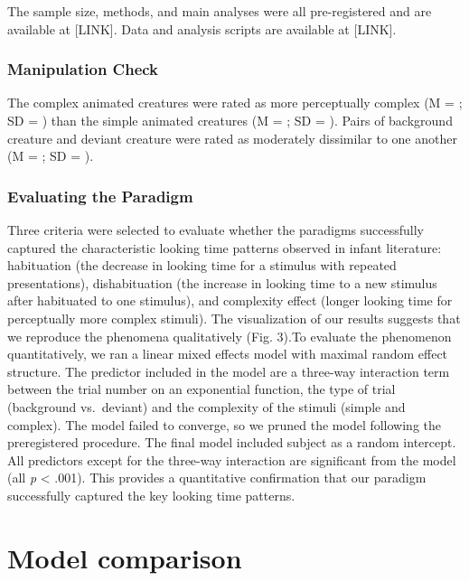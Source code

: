 \documentclass[10pt, letterpaper]{article}
\begin{document}
The sample size, methods, and main analyses were all pre-registered and
are available at {[}LINK{]}. Data and analysis scripts are available at
{[}LINK{]}.

\hypertarget{manipulation-check}{%
\subsubsection{Manipulation Check}\label{manipulation-check}}

The complex animated creatures were rated as more perceptually complex
(M = ; SD = ) than the simple animated creatures (M = ; SD = ). Pairs of
background creature and deviant creature were rated as moderately
dissimilar to one another (M = ; SD = ).

\hypertarget{evaluating-the-paradigm}{%
\subsubsection{Evaluating the Paradigm}\label{evaluating-the-paradigm}}

Three criteria were selected to evaluate whether the paradigms
successfully captured the characteristic looking time patterns observed
in infant literature: habituation (the decrease in looking time for a
stimulus with repeated presentations), dishabituation (the increase in
looking time to a new stimulus after habituated to one stimulus), and
complexity effect (longer looking time for perceptually more complex
stimuli). The visualization of our results suggests that we reproduce
the phenomena qualitatively (Fig. 3).To evaluate the phenomenon
quantitatively, we ran a linear mixed effects model with maximal random
effect structure. The predictor included in the model are a three-way
interaction term between the trial number on an exponential function,
the type of trial (background vs.~deviant) and the complexity of the
stimuli (simple and complex). The model failed to converge, so we pruned
the model following the preregistered procedure. The final model
included subject as a random intercept. All predictors except for the
three-way interaction are significant from the model (all \emph{p}
\textless{} .001). This provides a quantitative confirmation that our
paradigm successfully captured the key looking time patterns.

\hypertarget{model-comparison}{%
\section{Model comparison}\label{model-comparison}}
\end{document}
